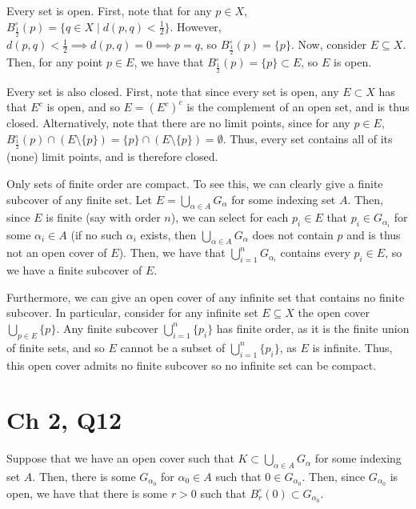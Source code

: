 \documentclass[12pt,letterpaper]{article}
\theoremstyle{definition}
\begin{document}
Every set is open. First, note that for any $p \in X$, $B_{\frac{1}{2}}^{\circ}(p) = \{q \in X \mid d(p,q) < \frac{1}{2}\}$. However, $d(p,q) < \frac{1}{2} \implies d(p,q) = 0 \implies p = q$, so $B_{\frac{1}{2}}^{\circ}(p) = \{p\}$. Now, consider $E \subseteq X$. Then, for any point $p \in E$, we have that $B_{\frac{1}{2}}^{\circ}(p) = \{p\} \subset E$, so $E$ is open.

Every set is also closed. First, note that since every set is open, any $E \subset X$ has that $E^{c}$ is open, and so $E = (E^{c})^{c}$ is the complement of an open set, and is thus closed. Alternatively, note that there are no limit points, since for any $p \in E$, $B_{\frac{1}{2}}^{\circ}(p) \cap (E \setminus \{p\}) = \{p\} \cap (E \setminus \{p\}) = \emptyset$. Thus, every set contains all of its (none) limit points, and is therefore closed.

Only sets of finite order are compact. To see this, we can clearly give a finite subcover of any finite set. Let $E = \bigcup_{\alpha \in A}G_{\alpha}$ for some indexing set $A$. Then, since $E$ is finite (say with order $n$), we can select for each $p_{i} \in E$ that $p_{i} \in G_{\alpha_{i}}$ for some $\alpha_{i} \in A$ (if no such $\alpha_{i}$ exists, then $\bigcup_{\alpha \in A}G_{\alpha}$ does not contain $p$ and is thus not an open cover of $E$). Then, we have that $\bigcup_{i=1}^{n}G_{\alpha_{i}}$ contains every $p_{i} \in E$, so we have a finite subcover of $E$.

Furthermore, we can give an open cover of any infinite set that contains no finite subcover. In particular, consider for any infinite set $E \subseteq X$ the open cover $\bigcup_{p \in E}\{p\}$. Any finite subcover $\bigcup_{i=1}^{n}\{p_{i}\}$ has finite order, as it is the finite union of finite sets, and so $E$ cannot be a subset of $\bigcup_{i=1}^{n}\{p_{i}\}$, as $E$ is infinite. Thus, this open cover admits no finite subcover so no infinite set can be compact.

\section*{Ch 2, Q12}

Suppose that we have an open cover such that $K \subset \bigcup_{\alpha \in A}G_{\alpha}$ for some indexing set $A$. Then, there is some $G_{\alpha_{0}}$ for $\alpha_{0} \in A$ such that $0 \in G_{\alpha_{0}}$. Then, since $G_{\alpha_{0}}$ is open, we have that there is some $r > 0$ such that $B_{r}^{\circ}(0) \subset G_{\alpha_{0}}$.
\end{document}
